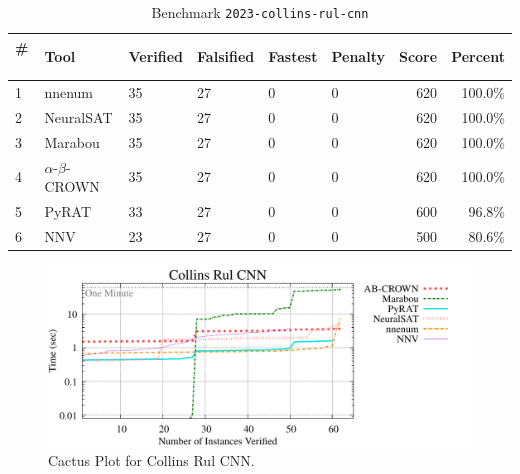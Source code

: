 \begin{table}[h]
\begin{center}
\caption{Benchmark \texttt{2023-collins-rul-cnn}} \label{tab:cat_{cat}}
{\setlength{\tabcolsep}{2pt}
\begin{tabular}[h]{@{}llllllrr@{}}
\toprule
\textbf{\# ~} & \textbf{Tool} & \textbf{Verified} & \textbf{Falsified} & \textbf{Fastest} & \textbf{Penalty} & \textbf{Score} & \textbf{Percent}\\
\midrule
1 & nnenum & 35 & 27 & 0 & 0 & 620 & 100.0\% \\
2 & NeuralSAT & 35 & 27 & 0 & 0 & 620 & 100.0\% \\
3 & Marabou & 35 & 27 & 0 & 0 & 620 & 100.0\% \\
4 & $\alpha$-$\beta$-CROWN & 35 & 27 & 0 & 0 & 620 & 100.0\% \\
5 & PyRAT & 33 & 27 & 0 & 0 & 600 & 96.8\% \\
6 & NNV & 23 & 27 & 0 & 0 & 500 & 80.6\% \\
\bottomrule
\end{tabular}
}
\end{center}
\end{table}



\begin{figure}[h]
\centerline{\includegraphics[width=\textwidth]{cactus/2023_collins_rul_cnn.pdf}}
\caption{Cactus Plot for Collins Rul CNN.}
\label{fig:quantPic}
\end{figure}



